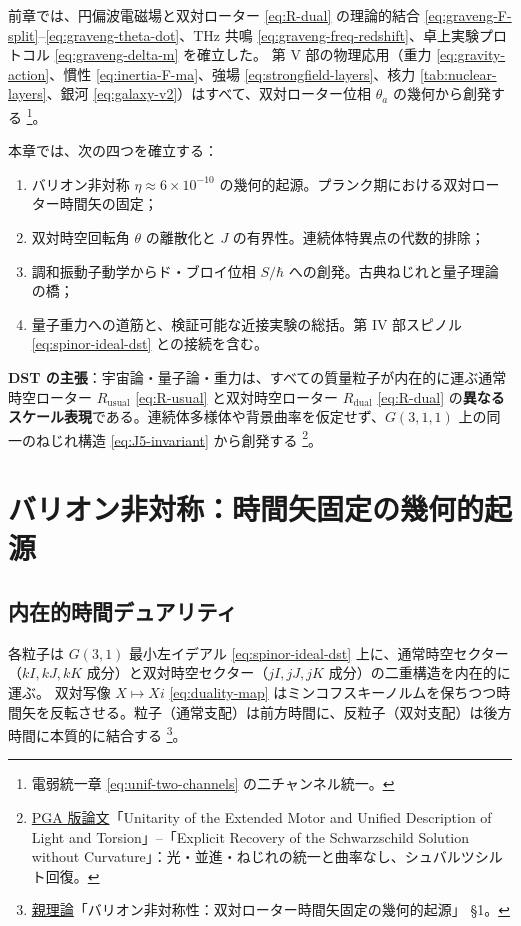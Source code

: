 \documentclass[dvipdfmx,a4paper,oneside]{jsbook}
\numberwithin{equation}{chapter}
\begin{document}
前章では、円偏波電磁場と双対ローター \eqref{eq:R-dual} の理論的結合 \eqref{eq:graveng-F-split}–\eqref{eq:graveng-theta-dot}、THz 共鳴 \eqref{eq:graveng-freq-redshift}、卓上実験プロトコル \eqref{eq:graveng-delta-m} を確立した。
第 V 部の物理応用（重力 \eqref{eq:gravity-action}、慣性 \eqref{eq:inertia-F-ma}、強場 \eqref{eq:strongfield-layers}、核力 \eqref{tab:nuclear-layers}、銀河 \eqref{eq:galaxy-v2}）はすべて、双対ローター位相 \(\theta_a\) の幾何から創発する \footnote{電弱統一章 \eqref{eq:unif-two-channels} の二チャンネル統一。}。

本章では、次の四つを確立する：
\begin{enumerate}[leftmargin=2em]
  \item バリオン非対称 \(\eta \approx 6 \times 10^{-10}\) の幾何的起源。プランク期における双対ローター時間矢の固定；
  \item 双対時空回転角 \(\theta\) の離散化と \(J\) の有界性。連続体特異点の代数的排除；
  \item 調和振動子動学からド・ブロイ位相 \(S/\hbar\) への創発。古典ねじれと量子理論の橋；
  \item 量子重力への道筋と、検証可能な近接実験の総括。第 IV 部スピノル \eqref{eq:spinor-ideal-dst} との接続を含む。
\end{enumerate}

\textbf{DST の主張}：宇宙論・量子論・重力は、すべての質量粒子が内在的に運ぶ通常時空ローター \(R_{\mathrm{usual}}\) \eqref{eq:R-usual} と双対時空ローター \(R_{\mathrm{dual}}\) \eqref{eq:R-dual} の\textbf{異なるスケール表現}である。連続体多様体や背景曲率を仮定せず、\(G(3,1,1)\) 上の同一のねじれ構造 \eqref{eq:J5-invariant} から創発する \footnote{\hyperref[sec:sister-manuscripts]{PGA 版論文}「Unitarity of the Extended Motor and Unified Description of Light and Torsion」–「Explicit Recovery of the Schwarzschild Solution without Curvature」：光・並進・ねじれの統一と曲率なし、シュバルツシルト回復。}。

\section{バリオン非対称：時間矢固定の幾何的起源}

\subsection{内在的時間デュアリティ}

各粒子は \(G(3,1)\) 最小左イデアル \eqref{eq:spinor-ideal-dst} 上に、通常時空セクター（\(kI, kJ, kK\) 成分）と双対時空セクター（\(jI, jJ, jK\) 成分）の二重構造を内在的に運ぶ。
双対写像 \(X \mapsto X i\) \eqref{eq:duality-map} はミンコフスキーノルムを保ちつつ時間矢を反転させる。粒子（通常支配）は前方時間に、反粒子（双対支配）は後方時間に本質的に結合する \footnote{\hyperref[sec:sister-manuscripts]{親理論}「バリオン非対称性：双対ローター時間矢固定の幾何的起源」 §1。}。
\end{document}
